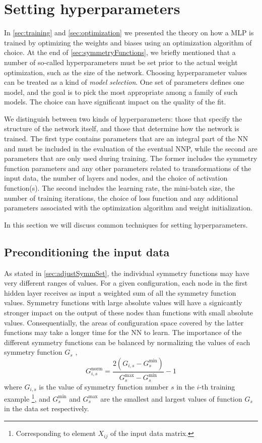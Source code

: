 \documentclass[twoside,english]{uiofysmaster}
\begin{document}
\section{Setting hyperparameters} \label{sec:settingHyperParams}
In \autoref{sec:training} and \autoref{sec:optimization} we presented the theory on how a MLP is trained 
by optimizing the weights and biases using an optimization algorithm of choice. 
At the end of \autoref{sec:symmetryFunctions}, we briefly mentioned that a number of so-called hyperparameters must be set
prior to the actual weight optimization, such as the size of the network. 
Choosing hyperparameter values can be treated as a
kind of \textit{model selection}. One set of parameters defines one model, and the goal is to pick the most appropriate 
among a family of such models. The choice can have significant impact on the quality of the fit. 

We distinguish between two kinds of hyperparameters: those that specify the structure of the 
network itself, and those that determine how the network is trained. 
The first type contains parameters that are an integral part of the NN and must be included in the evaluation of the eventual NNP, 
while the second are parameters that are only used during training. The former includes the symmetry function parameters
and any other parameters related to transformations of the input data, the number of layers and nodes, and the choice of 
activation function(s). The second includes 
the learning rate, the mini-batch size, the number of training iterations, the choice of loss function and any additional 
parameters associated with the optimization algorithm and weight initialization.

\noindent In this section we will discuss common techniques for setting hyperparameters. 

\subsection{Preconditioning the input data} \label{sec:transformInputData}
As stated in \autoref{sec:adjustSymmSet}, the individual symmetry functions may have very different ranges of values. 
For a given configuration, each node in the first hidden layer receives as input a weighted sum of all the symmetry function values.
Symmetry functions with large absolute values will have a signicantly stronger impact on the output of these nodes than 
functions with small absolute values. Consequentially, the areas of configuration space covered by the latter functions
may take a longer time for the NN to learn. The importance of the different symmetry functions can be balanced
by normalizing the values of each symmetry function $G_s$  \cite{Behler15}, 
\begin{equation}
 G_{i,s}^\mathrm{norm} = \frac{2(G_{i,s} - G^{\min}_s)} {G^{\max}_s - G^{\min}_s} - 1
 \label{scalingInputData}
\end{equation}
where $G_{i,s}$ is the value of symmetry function number $s$ in the $i$-th training example%
\footnote{Corresponding to element $X_{ij}$ of the input data matrix.}, and
$G_s^{\min}$ and $G_s^{\max}$ are the smallest and largest values of function $G_s$ in the data set respectively.
\end{document}
